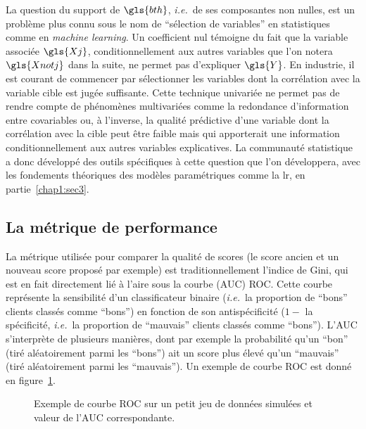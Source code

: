 La question du support  de $\gls{bth}$, \textit{i.e.}\ de ses composantes non nulles, est un problème plus connu sous le nom de ``sélection de variables'' en statistiques comme en \textit{machine learning}. Un coefficient nul témoigne du fait que la variable associée $\gls{Xj}$, conditionnellement aux autres variables que l'on notera $\gls{Xnotj}$ dans la suite, ne permet pas d'expliquer $\gls{Y}$. En industrie, il est courant de commencer par sélectionner les variables dont la corrélation avec la variable cible est jugée suffisante. Cette technique univariée ne permet pas de rendre compte de phénomènes multivariées comme la redondance d'information entre covariables ou, à l'inverse, la qualité prédictive d'une variable dont la corrélation avec la cible peut être faible mais qui apporterait une information conditionnellement aux autres variables explicatives. La communauté statistique a donc développé des outils spécifiques à cette question que l'on développera, avec les fondements théoriques des modèles paramétriques comme la \gls{lr}, en partie~\ref{chap1:sec3}.

\subsection{La métrique de performance}

La métrique utilisée pour comparer la qualité de \glspl{score} (le score ancien et un nouveau score proposé par exemple) est traditionnellement l'indice de Gini, qui est en fait directement lié à l'aire sous la courbe (AUC) ROC. Cette courbe représente la sensibilité d'un classificateur binaire (\textit{i.e.}\ la proportion de ``bons'' clients classés comme ``bons'') en fonction de son antispécificité ($1-$ la spécificité, \textit{i.e.}\ la proportion de ``mauvais'' clients classés comme ``bons''). L'AUC s'interprète de plusieurs manières, dont par exemple la probabilité qu'un ``bon'' (tiré aléatoirement parmi les ``bons'') ait un score plus élevé qu'un ``mauvais'' (tiré aléatoirement parmi les ``mauvais''). Un exemple de courbe ROC est donné en figure~\ref{fig:ROC}.

\begin{figure}
\centering \scalebox{.8}{}
\caption{\label{fig:ROC} Exemple de courbe ROC sur un petit jeu de données simulées et valeur de l'AUC correspondante.}
\end{figure}

